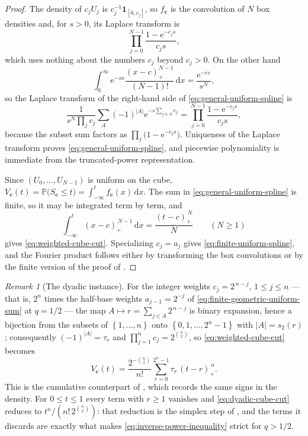 \documentclass[11pt,oneside,openany]{book}
\theoremstyle{definition}
\theoremstyle{remark}
\newtheorem{remark}[remark]{Remark}
\newcommand{\e}{\mathrm e}
\newcommand{\dd}{\,\mathrm d}
\newcommand{\one}{\mathbf 1}
\newcommand{\abs}[1]{\lvert #1\rvert}
\newcommand{\set}[1]{\left\{#1\right\}}
\begin{document}
\begin{proof}
The density of $c_jU_j$ is $c_j^{-1}\one_{[0,c_j]}$, so $f_{\mathbf c}$ is the convolution
of $N$ box densities and, for $s>0$, its Laplace transform is
\[
 \prod_{j=0}^{N-1}\frac{1-\e^{-c_js}}{c_js},
\]
which uses nothing about the numbers $c_j$ beyond $c_j>0$.  On the other hand
\[
 \int_0^\infty\e^{-sx}\frac{(x-c)_+^{N-1}}{(N-1)!}\dd x=\frac{\e^{-cs}}{s^N},
\]
so the Laplace transform of the right-hand side of \eqref{eq:general-uniform-spline} is
\[
 \frac1{s^N\prod_jc_j}\sum_A(-1)^{\abs A}\e^{-s\sum_{j\in A}c_j}
 =\prod_{j=0}^{N-1}\frac{1-\e^{-c_js}}{c_js},
\]
because the subset sum factors as $\prod_j\bigl(1-\e^{-c_js}\bigr)$.  Uniqueness of the
Laplace transform proves \eqref{eq:general-uniform-spline}, and piecewise polynomiality is
immediate from the truncated-power representation.

Since $(U_0,\ldots,U_{N-1})$ is uniform on the cube,
$V_{\mathbf c}(t)=\mathbb P\bigl(S_{\mathbf c}\le t\bigr)
=\int_{-\infty}^{t}f_{\mathbf c}(x)\dd x$.  The sum in
\eqref{eq:general-uniform-spline} is finite, so it may be integrated term by term, and
\[
 \int_{-\infty}^{t}(x-c)_+^{\,N-1}\dd x=\frac{(t-c)_+^{\,N}}{N}
 \qquad(N\ge1)
\]
gives \eqref{eq:weighted-cube-cut}.  Specializing $c_j=a_j$ gives
\eqref{eq:finite-uniform-spline}, and the Fourier product follows either by transforming
the box convolutions or by the finite version of the proof of
.
\end{proof}

\begin{remark}[The dyadic instance]\label{rem:dyadic-cube-cut}
For the integer weights $c_j=2^{\,n-j}$, $1\le j\le n$ --- that is, $2^n$ times the
half-base weights $a_{j-1}=2^{-j}$ of \eqref{eq:finite-geometric-uniform-sum} at $q=1/2$
--- the map $A\mapsto r=\sum_{j\in A}2^{\,n-j}$ is binary expansion, hence a bijection
from the subsets of $\set{1,\ldots,n}$ onto $\set{0,1,\ldots,2^n-1}$ with
$\abs A=s_2(r)$; consequently $(-1)^{\abs A}=\tau_r$ and
$\prod_{j=1}^{n}c_j=2^{\binom n2}$, so \eqref{eq:weighted-cube-cut} becomes
\begin{equation}\label{eq:dyadic-cube-cut}
 V_{\mathbf c}(t)=\frac{2^{-\binom n2}}{n!}\sum_{r=0}^{2^n-1}\tau_r\,(t-r)_+^{\,n}.
\end{equation}
This is the cumulative counterpart of , which records
the same signs in the density.  For $0\le t\le1$ every term with $r\ge1$ vanishes and
\eqref{eq:dyadic-cube-cut} reduces to $t^n/(n!\,2^{\binom n2})$: that reduction is the
simplex step of , and the terms it discards are exactly
what makes \eqref{eq:inverse-power-inequality} strict for $q>1/2$.
\end{remark}
\end{document}
